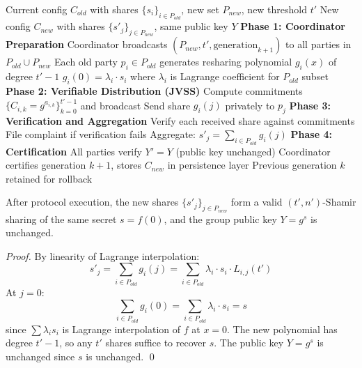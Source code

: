 \begin{algorithm}
\caption{LSS Dynamic Reshare: $(t, n) \to (t', n')$}
\begin{algorithmic}[1]
\Require Current config $C_{old}$ with shares $\{s_i\}_{i \in P_{old}}$, new set $P_{new}$, new threshold $t'$
\Ensure New config $C_{new}$ with shares $\{s'_j\}_{j \in P_{new}}$, same public key $Y$
\State \textbf{Phase 1: Coordinator Preparation}
\State Coordinator broadcasts $(P_{new}, t', \text{generation}_{k+1})$ to all parties in $P_{old} \cup P_{new}$
\State Each old party $p_i \in P_{old}$ generates resharing polynomial $g_i(x)$ of degree $t' - 1$
\State $g_i(0) = \lambda_i \cdot s_i$ where $\lambda_i$ is Lagrange coefficient for $P_{old}$ subset
\State \textbf{Phase 2: Verifiable Distribution (JVSS)}
  \State Compute commitments $\{C_{i,k} = g^{a_{i,k}}\}_{k=0}^{t'-1}$ and broadcast
    \State Send share $g_i(j)$ privately to $p_j$
  \EndFor
\EndFor
\State \textbf{Phase 3: Verification and Aggregation}
  \State Verify each received share against commitments
  \State File complaint if verification fails
  \State Aggregate: $s'_j = \sum_{i \in P_{old}} g_i(j)$
\EndFor
\State \textbf{Phase 4: Certification}
\State All parties verify $Y' = Y$ (public key unchanged)
\State Coordinator certifies generation $k+1$, stores $C_{new}$ in persistence layer
\State Previous generation $k$ retained for rollback
\end{algorithmic}
\end{algorithm}

\begin{theorem}
After protocol execution, the new shares $\{s'_j\}_{j \in P_{new}}$ form a valid $(t', n')$-Shamir sharing of the same secret $s = f(0)$, and the group public key $Y = g^s$ is unchanged.
\end{theorem}

\begin{proof}
By linearity of Lagrange interpolation:
\[
  s'_j = \sum_{i \in P_{old}} g_i(j) = \sum_{i \in P_{old}} \lambda_i \cdot s_i \cdot L_{i,j}(t')
\]
At $j = 0$:
\[
  \sum_{i \in P_{old}} g_i(0) = \sum_{i \in P_{old}} \lambda_i \cdot s_i = s
\]
since $\sum \lambda_i s_i$ is Lagrange interpolation of $f$ at $x = 0$. The new polynomial has degree $t' - 1$, so any $t'$ shares suffice to recover $s$. The public key $Y = g^s$ is unchanged since $s$ is unchanged. \qed
\end{proof}


